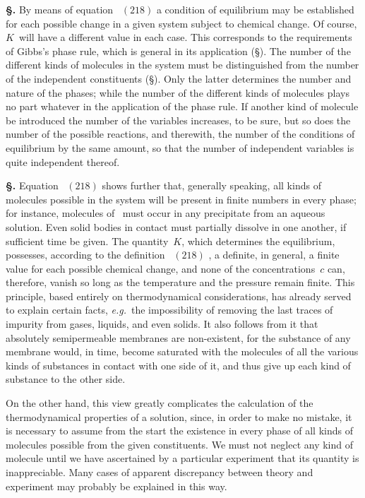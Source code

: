 \documentclass[12pt]{book}[2005/09/16]
\newcommand{\Erratum}[2]{#2}
\newcommand{\Section}[1]{
  \medskip\par\textbf{§\;#1}
  \label{section:#1}
}
\newcommand{\SecRef}[2][§\;]{\hyperref[section:#2.]{{\upshape #1#2}}}
\newcommand{\Eq}[1]{%
  \hyperref[eqn:#1]{\ensuremath{#1}}%
}
\newcommand{\PageSep}[1]{\ignorespaces}
\newcommand{\eg}{\emph{e.g.}}
\begin{document}
\Section{258.} By means of equation~\Eq{(218)} a condition of equilibrium
may be established for each possible change in a
given system subject to chemical change. Of course, $K$~will
have a different value in each case. This corresponds
to the requirements of Gibbs's phase rule, which is general
%
%
in its application (\SecRef{204}). The number of the different
kinds of molecules in the system must be distinguished
from the number of the independent constituents (\SecRef{198}).
Only the latter determines the number and nature of the
phases; while the number of the different kinds of molecules
plays no part whatever in the application of the phase rule.
If another kind of molecule be introduced the number of
the variables increases, to be sure, but so does the number
of the possible reactions, and therewith, the number of the
conditions of equilibrium by the same amount, so that the
number of independent variables is quite independent
thereof.

\Section{259.} \Erratum{Equations}{Equation}~\Eq{(218)} shows further that, generally
speaking, all kinds of molecules possible in the system
\PageSep{233}
will be present in finite numbers in every phase; for instance,
molecules of~ must occur in any precipitate from an
aqueous solution. Even solid bodies in contact must
partially dissolve in one another, if sufficient time be given.
The quantity~$K$, which determines the equilibrium, possesses,
according to the definition~\Eq{(218)}, a definite, in general, a finite
value for each possible chemical change, and none of the
concentrations~$c$ can, therefore, vanish so long as the
temperature and the pressure remain finite. This principle,
based entirely on thermodynamical considerations, has
already served to explain certain facts, \eg\ the impossibility
of removing the last traces of impurity from gases, liquids,
and even solids. It also follows from it that absolutely semipermeable
membranes are non-existent, for the substance
of any membrane would, in time, become saturated with
the molecules of all the various kinds of substances in
contact with one side of it, and thus give up each kind of
substance to the other side.

On the other hand, this view greatly complicates the
calculation of the thermodynamical properties of a solution,
since, in order to make no mistake, it is necessary to assume
from the start the existence in every phase of all kinds of
molecules possible from the given constituents. We must
not neglect any kind of molecule until we have ascertained
by a particular experiment that its quantity is inappreciable.
Many cases of apparent discrepancy between theory and
experiment may probably be explained in this way.
\end{document}
